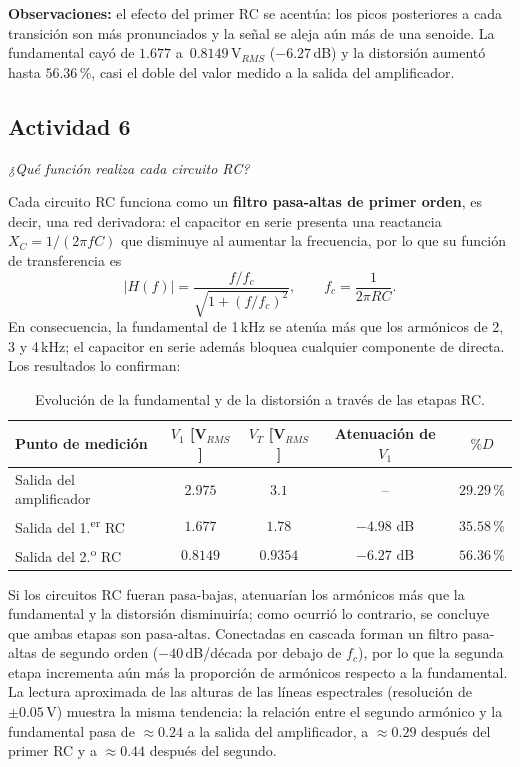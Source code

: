 \documentclass[12pt]{article}
\begin{document}
\textbf{Observaciones:} el efecto del primer RC se acentúa: los picos posteriores a cada transición son más pronunciados y la señal se aleja aún más de una senoide. La fundamental cayó de $1.677$ a\ $0.8149$\,V$_{RMS}$ ($-6.27$\,dB) y la distorsión aumentó hasta $56.36\,\%$, casi el doble del valor medido a la salida del amplificador.

\subsection{Actividad 6}

\textit{¿Qué función realiza cada circuito RC?}

Cada circuito RC funciona como un \textbf{filtro pasa\nobreakdash-altas de primer orden}, es decir, una red derivadora: el capacitor en serie presenta una reactancia $X_C = 1/(2\pi f C)$ que disminuye al aumentar la frecuencia, por lo que su función de transferencia es
\[
|H(f)| = \frac{f/f_c}{\sqrt{1 + (f/f_c)^2}}, \qquad f_c = \frac{1}{2\pi RC}.
\]
En consecuencia, la fundamental de 1\,kHz se atenúa más que los armónicos de 2, 3 y 4\,kHz; el capacitor en serie además bloquea cualquier componente de directa. Los resultados lo confirman:

\begin{table}[H]
\centering
\begin{tabular}{|l|c|c|c|c|}
\hline
\textbf{Punto de medición} & $V_1$ [V$_{RMS}$] & $V_T$ [V$_{RMS}$] & \textbf{Atenuación de $V_1$} & $\%D$ \\ \hline
Salida del amplificador & $2.975$ & $3.1$ & -- & $29.29\,\%$ \\ \hline
Salida del 1.\textsuperscript{er} RC & $1.677$ & $1.78$ & $-4.98$ dB & $35.58\,\%$ \\ \hline
Salida del 2.\textsuperscript{o} RC & $0.8149$ & $0.9354$ & $-6.27$ dB & $56.36\,\%$ \\ \hline
\end{tabular}
\caption{Evolución de la fundamental y de la distorsión a través de las etapas RC.}
\end{table}

Si los circuitos RC fueran pasa-bajas, atenuarían los armónicos más que la fundamental y la distorsión disminuiría; como ocurrió lo contrario, se concluye que ambas etapas son pasa-altas. Conectadas en cascada forman un filtro pasa-altas de segundo orden ($-40$\,dB/década por debajo de $f_c$), por lo que la segunda etapa incrementa aún más la proporción de armónicos respecto a la fundamental. La lectura aproximada de las alturas de las líneas espectrales (resolución de $\pm 0.05$\,V) muestra la misma tendencia: la relación entre el segundo armónico y la fundamental pasa de $\approx 0.24$ a la salida del amplificador, a $\approx 0.29$ después del primer RC y a $\approx 0.44$ después del segundo.
\end{document}
